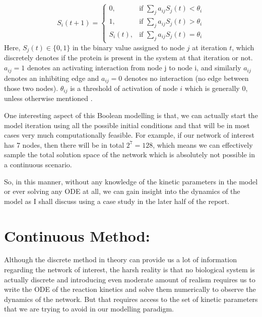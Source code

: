 \documentclass{article}
\begin{document}
\begin{equation*}
  S_i (t+1) = \begin{cases}
    0, & \text{if } \sum_{j} a_{ij} S_j(t) < \theta_i\\
    1, & \text{if } \sum_{j} a_{ij} S_j(t) > \theta_i\\
    S_i (t), & \text{if } \sum_{j} a_{ij} S_j(t) = \theta_i
    \end{cases}
\end{equation*}
Here, $S_j(t) \in \{0,1\}$ in the binary value assigned to node $j$ at iteration
$t$, which discretely denotes if the protein is present in the system at that 
iteration or not. $a_{ij} = 1$ denotes an activating interaction from node j to 
node i, and similarly $a_{ij}$ denotes an inhibiting edge and $a_{ij} = 0$
denotes no interaction (no edge between those two nodes). $\theta_{ij}$ is a 
threshold of activation of node $i$ which is generally $0$, unless otherwise 
mentioned \cite{boolean_model}.

One interesting aspect of this Boolean modelling is that, we can actually 
start the model iteration using all the possible initial conditions and that 
will be in most cases very much computationally feasible. For example, if our 
network of interest has 7 nodes, then there will be in total $2^7 = 128$, which 
means we can effectively sample the total solution space of the network which 
is absolutely not possible in a continuous scenario.

So, in this manner, without any knowledge of the kinetic parameters in the model
or ever solving any ODE at all, we can gain insight into the dynamics of the model
as I shall discuss using a case study in the later half of the report.
\section*{Continuous Method:} Although the discrete method in theory can provide
us a lot of information regarding the network of interest, the harsh reality 
is that no biological system is actually discrete and introducing even moderate
amount of realism requires us to write the ODE of the reaction kinetics and solve 
them numerically to observe the dynamics of the network. But that requires 
access to the set of kinetic parameters that we are trying to avoid in our 
modelling paradigm. 
\end{document}
